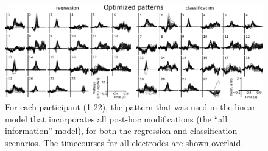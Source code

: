 \documentclass[a4paper]{vanvliet_paper}
\begin{document}
\begin{figure}[p]
\includegraphics[width=18cm]{figures/patterns_optimized.pdf}
\vspace{2ex}
\caption{For each participant (1-22), the pattern that was used in the linear model that incorporates all post-hoc modifications (the ``all information'' model), for both the regression and classification scenarios. The timecourses for all electrodes are shown overlaid.}\label{fig:patterns-optimized}
\end{figure}
\end{document}
